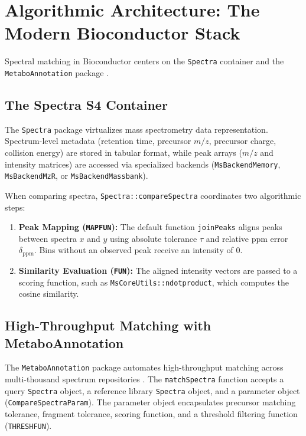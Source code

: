 \documentclass[11pt,twoside,openright]{book}
\begin{document}
\section{Algorithmic Architecture: The Modern Bioconductor Stack}

Spectral matching in Bioconductor centers on the \texttt{Spectra} container \cite{gatto2021spectra} and the \texttt{MetaboAnnotation} package \cite{rainer2022modular}. 

\subsection{The Spectra S4 Container}
The \texttt{Spectra} package virtualizes mass spectrometry data representation. Spectrum-level metadata (retention time, precursor $m/z$, precursor charge, collision energy) are stored in tabular format, while peak arrays ($m/z$ and intensity matrices) are accessed via specialized backends (\texttt{MsBackendMemory}, \texttt{MsBackendMzR}, or \texttt{MsBackendMassbank}).

When comparing spectra, \texttt{Spectra::compareSpectra} coordinates two algorithmic steps:
\begin{enumerate}
    \item \textbf{Peak Mapping (\texttt{MAPFUN}):} The default function \texttt{joinPeaks} aligns peaks between spectra $x$ and $y$ using absolute tolerance $\tau$ and relative ppm error $\delta_{\text{ppm}}$. Bins without an observed peak receive an intensity of 0.
    \item \textbf{Similarity Evaluation (\texttt{FUN}):} The aligned intensity vectors are passed to a scoring function, such as \texttt{MsCoreUtils::ndotproduct}, which computes the cosine similarity.
\end{enumerate}

\subsection{High-Throughput Matching with MetaboAnnotation}
The \texttt{MetaboAnnotation} package automates high-throughput matching across multi-thousand spectrum repositories \cite{rainer2022modular}. The \texttt{matchSpectra} function accepts a query \texttt{Spectra} object, a reference library \texttt{Spectra} object, and a parameter object (\texttt{CompareSpectraParam}). The parameter object encapsulates precursor matching tolerance, fragment tolerance, scoring function, and a threshold filtering function (\texttt{THRESHFUN}).
\end{document}
